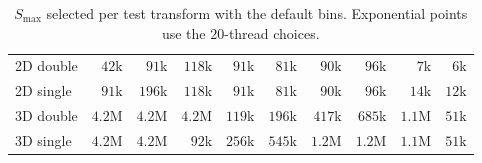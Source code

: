 \begin{table}[p]
\begin{tabular}{lrrrrrrrrr}
        2D double & $42$k & $91$k & $118$k & $91$k & $81$k & $90$k & $96$k & $7$k & $6$k \\
        2D single & $91$k & $196$k & $118$k & $91$k & $81$k & $90$k & $96$k & $14$k & $12$k \\
        3D double & $4.2$M & $4.2$M & $4.2$M & $119$k & $196$k & $417$k & $685$k & $1.1$M & $51$k \\
        3D single & $4.2$M & $4.2$M & $92$k & $256$k & $545$k & $1.2$M & $1.2$M & $1.1$M & $51$k \\
        \bottomrule
    \end{tabular}
    \caption{$S_{\max}$ selected per test transform with the default bins. Exponential points use the $20$-thread choices.}
    \label{tab:app_sp_picks}
\end{table}

